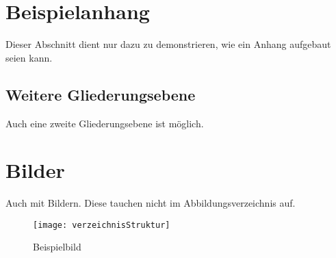 \section{Beispielanhang}\label{Beispielanhang}
Dieser Abschnitt dient nur dazu zu demonstrieren, wie ein Anhang aufgebaut seien kann.
\subsection{Weitere Gliederungsebene}
Auch eine zweite Gliederungsebene ist möglich.
\section{Bilder}
Auch mit Bildern.
Diese tauchen nicht im Abbildungsverzeichnis auf.
\begin{figure}[H]
	\centering
	\caption[]{Beispielbild}
	\label{fig:Beispielbild}
	\texttt{[image: verzeichnisStruktur]}
\end{figure}